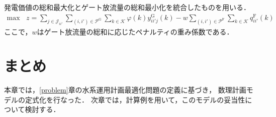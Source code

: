 	発電価値の総和最大化とゲート放流量の総和最小化を統合したものを用いる．
		\begin{equation}
		\begin{split}
			\mathrm {max} \ \ \ \ 
			z = \sum_{ j \in \mathcal {J}_{ii'}}  \sum_{ ( i , i' ) \in \mathcal {P}^{\mathrm G}} %
			\sum_{k \in \mathcal{K}} \varphi (k) y^{\mathrm G}_{ii'j}(k)%
			- w \sum_{ ( i ,  i' ) \in \mathcal{P}^{\mathrm F}}%
			\sum_{k \in \mathcal{K}} q^{\mathrm F}_{ii'} (k) 
		\end{split}	
		\end{equation}
	ここで，$w$はゲート放流量の総和に応じたペナルティの重み係数である．
	
\section{まとめ}
	本章では，\ref{problem}章の水系運用計画最適化問題の定義に基づき，
	数理計画モデルの定式化を行なった．
	次章では，計算例を用いて，このモデルの妥当性について検討する．
